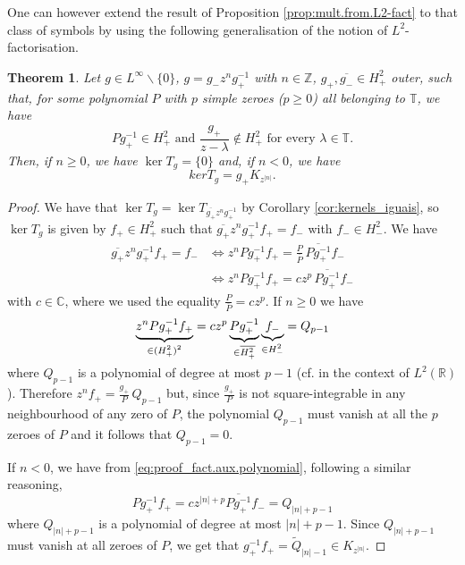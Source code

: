 \documentclass[12pt]{elsarticle}
\numberwithin{equation}{section}
\theoremstyle{plain}
\newtheorem{thm}{Theorem}[section]
\newcommand{\Hp}{\ensuremath{H^2_+}}
\newcommand{\Hm}{\ensuremath{H^2_-}}
\newcommand{\Linf}{\ensuremath{L^\infty}}
\newcommand{\TT}{\ensuremath{\mathbb{T}}}
\newcommand{\CC}{\ensuremath{\mathbb{C}}}
\newcommand{\ZZ}{\ensuremath{\mathbb{Z}}}
\newcommand{\ol}[1]{\ensuremath{\overline{#1}}}
\newcommand{\annot}[2]{\underbrace{#1}_{\smash[b]{\scriptstyle #2}}}
\newcommand{\bs}{\backslash}
\newcommand{\zero}{\ensuremath{\{0\}}}
\newcommand{\gnotzero}{\ensuremath{g\in\Linf\bs\zero}}
\begin{document}
One can however extend the result of Proposition \ref{prop:mult.from.L2-fact} to that class of symbols by using the following generalisation of the notion of $L^2$-factorisation.


\begin{thm}
\label{thm:fact.aux.polynomial}
Let $\gnotzero $, $g = g_- z^n g_+^{-1}$ with $n\in\ZZ$, $g_+,\ol{g_-} \in \Hp$ outer, such that, for some polynomial $P$ with $p$ simple zeroes ($p\geq 0$) all belonging to \TT, we have
\begin{equation}
\label{eq:fact.aux.polynomial}
Pg_+^{-1} \in \Hp \text{ and } \frac{g_+}{z-\lambda} \notin \Hp \text{ for every } \lambda \in \TT.
\end{equation}
Then, if $n\geq 0$, we have $\ker T_g = \zero$ and, if $n<0$, we have
\begin{equation}
\label{eq:mult.from.fact.aux.polynomial}
ker T_g = g_+ K_{z^{|n|}}.
\end{equation}
\end{thm}


\begin{proof}
We have that $\ker T_g = \ker T_{\ol{g_+} z^n g_+^{-1}}$ by Corollary \ref{cor:kernels_iguais}, so $\ker T_g$ is given by $f_+ \in \Hp$ such that $\ol{g_+} z^n g_+^{-1} f_+ = f_-$ with $f_-\in \Hm$.
We have
\begin{align}
\ol{g_+} z^n g_+^{-1} f_+ = f_- & \iff z^n P g_+^{-1} f_+ = \frac{P}{\ol P} \, \ol{P g_+^{-1}} f_- \nonumber \\
		& \iff z^n P g_+^{-1} f_+ = c z^p \, \ol{P g_+^{-1}} f_-
		\label{eq:proof_fact.aux.polynomial}
\end{align}
with $c\in\CC$, where we used the equality $\frac{P}{\ol P} = cz^p$.
If $n\geq 0$ we have
\[
\annot{z^n P g_+^{-1} f_+}{\in (\Hp)^2}
=
c z^p
\annot{P g_+^{-1}}{\in\ol\Hp}
\annot{f_-}{\in \Hm}
= Q_{p-1}
\]
where $Q_{p-1}$ is a polynomial of degree at most $p-1$ (cf. \cite{CMP16} in the context of $L^2(\mathbb{R})$).
Therefore $z^n f_+ = \frac{g_+}{P}\, Q_{p-1}$
but, since $\frac{g_+}{P}$ is not square-integrable in any neighbourhood of any zero of $P$, the polynomial $Q_{p-1}$ must vanish at all the $p$ zeroes of $P$ and it follows that $Q_{p-1}=0$.

If $n<0$, we have from \eqref{eq:proof_fact.aux.polynomial}, following a similar reasoning,
\[
Pg_+^{-1} f_+ = c z^{|n|+p} \ol{Pg_+^{-1}} f_- = Q_{|n|+p-1}
\]
where $Q_{|n|+p-1}$ is a polynomial of degree at most $|n|+p-1$.
Since $Q_{|n|+p-1}$ must vanish at all zeroes of $P$, we get that
$g_+^{-1} f_+ = \tilde Q_{|n|-1} \in K_{z^{|n|}}$.
\end{proof}
\end{document}
